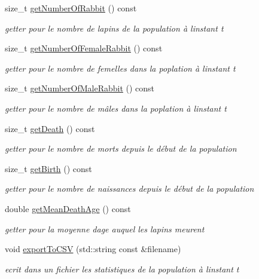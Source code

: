 \begin{DoxyCompactItemize}
size\+\_\+t \hyperlink{classPopulation_a7388e8d8308abe505b7fa95c759a03ea}{get\+Number\+Of\+Rabbit} () const
\begin{DoxyCompactList}\small\item\em getter pour le nombre de lapins de la population à l\textquotesingle{}instant t \end{DoxyCompactList}\item 
size\+\_\+t \hyperlink{classPopulation_a13d2cee6f6bf940eea261b61c5999e1f}{get\+Number\+Of\+Female\+Rabbit} () const
\begin{DoxyCompactList}\small\item\em getter pour le nombre de femelles dans la poplation à l\textquotesingle{}instant t \end{DoxyCompactList}\item 
size\+\_\+t \hyperlink{classPopulation_a74dc9a5e829548a16d7910d7c17bb751}{get\+Number\+Of\+Male\+Rabbit} () const
\begin{DoxyCompactList}\small\item\em getter pour le nombre de mâles dans la poplation à l\textquotesingle{}instant t \end{DoxyCompactList}\item 
size\+\_\+t \hyperlink{classPopulation_a8cf700f7fa2dfd54035322c05bfc9914}{get\+Death} () const
\begin{DoxyCompactList}\small\item\em getter pour le nombre de morts depuis le début de la population \end{DoxyCompactList}\item 
size\+\_\+t \hyperlink{classPopulation_a703218d79e0d156a10c19e70d7433fa9}{get\+Birth} () const
\begin{DoxyCompactList}\small\item\em getter pour le nombre de naissances depuis le début de la population \end{DoxyCompactList}\item 
double \hyperlink{classPopulation_aa5a0becf703f219c9e1a4270d54c397e}{get\+Mean\+Death\+Age} () const
\begin{DoxyCompactList}\small\item\em getter pour la moyenne d\textquotesingle{}age auquel les lapins meurent \end{DoxyCompactList}\item 
void \hyperlink{classPopulation_a4c7cc56a0bce95aa909bc75df7043f1a}{export\+To\+C\+SV} (std\+::string const \&filename)
\begin{DoxyCompactList}\small\item\em ecrit dans un fichier les statistiques de la population à l\textquotesingle{}instant t \end{DoxyCompactList}\end{DoxyCompactItemize}


